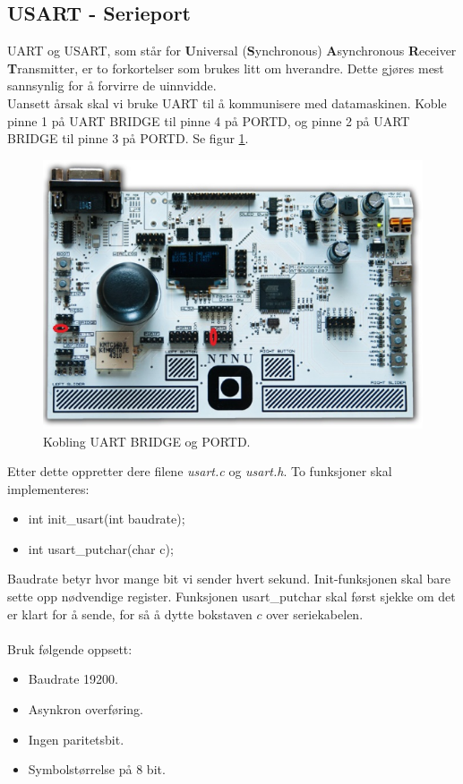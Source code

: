 \documentclass[11pt,a4paper]{article}
\begin{document}
\subsection{USART - Serieport}
UART og USART, som står for \textbf{U}niversal (\textbf{S}ynchronous) \textbf{A}synchronous \textbf{R}eceiver \textbf{T}ransmitter, er to forkortelser som brukes litt om hverandre. Dette gjøres mest sannsynlig for å forvirre de uinnvidde.\\
Uansett årsak skal vi bruke UART til å kommunisere med datamaskinen. Koble pinne 1 på UART BRIDGE til pinne 4 på PORTD, og pinne 2 på UART BRIDGE til pinne 3 på PORTD. Se figur \ref{UART::PORTD}.
\begin{figure}[hb]
\centering
\includegraphics[width=0.8\linewidth]{uart_portd.png}
\caption{Kobling UART BRIDGE og PORTD.}
\label{UART::PORTD}
\end{figure}
Etter dette oppretter dere filene \textit{usart.c} og \textit{usart.h}. To funksjoner skal implementeres:
\begin{itemize}
\item int init\_usart(int baudrate);
\item int usart\_putchar(char c);
\end{itemize}
Baudrate betyr hvor mange bit vi sender hvert sekund. Init-funksjonen skal bare sette opp nødvendige register. Funksjonen usart\_putchar skal først sjekke om det er klart for å sende, for så å dytte bokstaven $c$ over seriekabelen.\\
\\
Bruk følgende oppsett:
\begin{itemize}
\item Baudrate 19200.
\item Asynkron overføring.
\item Ingen paritetsbit.
\item Symbolstørrelse på 8 bit.
\end{itemize}
\end{document}
